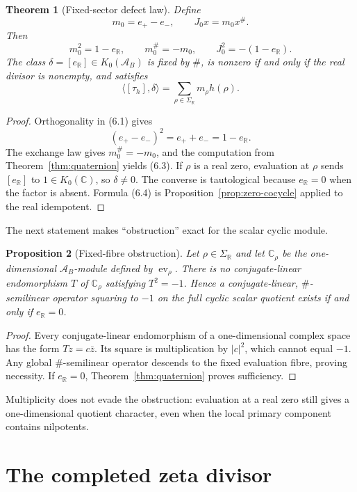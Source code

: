 \documentclass[11pt]{article}
\newtheorem{theorem}{Theorem}[section]
\newtheorem{proposition}[theorem]{Proposition}
\theoremstyle{definition}
\theoremstyle{remark}
\newcommand{\C}{\mathbb C}
\newcommand{\R}{\mathbb R}
\newcommand{\A}{\mathcal A}
\newcommand{\ev}{\operatorname{ev}}
\begin{document}
\begin{theorem}[Fixed-sector defect law]\label{thm:defect}
Define
\[
        m_0=e_+-e_-,\qquad J_0x=m_0x^\#.             \tag{6.2}
\]
Then
\[
       m_0^2=1-e_{\R},\qquad m_0^\#=-m_0,
       \qquad J_0^2=-(1-e_{\R}).                      \tag{6.3}
\]
The class $\delta=[e_{\R}]\in K_0(\A_B)$ is fixed by $\#$, is nonzero if and
only if the real divisor is nonempty, and satisfies
\[
       \langle[\tau_h],\delta\rangle
       =\sum_{\rho\in\Sigma_{\R}}m_\rho h(\rho).      \tag{6.4}
\]
\end{theorem}

\begin{proof}
Orthogonality in (6.1) gives
\[
 (e_+-e_-)^2=e_++e_-=1-e_{\R}.
\]
The exchange law gives $m_0^\#=-m_0$, and the computation from
Theorem~\ref{thm:quaternion} yields (6.3).  If $\rho$ is a real zero, evaluation
at $\rho$ sends $[e_{\R}]$ to $1\in K_0(\C)$, so $\delta\ne0$.  The converse is
tautological because $e_{\R}=0$ when the factor is absent.  Formula (6.4) is
Proposition~\ref{prop:zero-cocycle} applied to the real idempotent.
\end{proof}

The next statement makes ``obstruction'' exact for the scalar cyclic module.

\begin{proposition}[Fixed-fibre obstruction]\label{prop:fibre}
Let $\rho\in\Sigma_{\R}$ and let
$\C_\rho$ be the one-dimensional $\A_B$-module defined by $\ev_\rho$.  There is
no conjugate-linear endomorphism $T$ of $\C_\rho$ satisfying $T^2=-1$.  Hence a
conjugate-linear, $\#$-semilinear operator squaring to $-1$ on the full cyclic
scalar quotient exists if and only if $e_{\R}=0$.
\end{proposition}

\begin{proof}
Every conjugate-linear endomorphism of a one-dimensional complex space has the
form $Tz=c\bar z$.  Its square is multiplication by $|c|^2$, which cannot equal
$-1$.  Any global $\#$-semilinear operator descends to the fixed evaluation
fibre, proving necessity.  If $e_{\R}=0$, Theorem~\ref{thm:quaternion} proves
sufficiency.
\end{proof}

Multiplicity does not evade the obstruction: evaluation at a real zero still
gives a one-dimensional quotient character, even when the local primary
component contains nilpotents.

\section{The completed zeta divisor}
\end{document}

